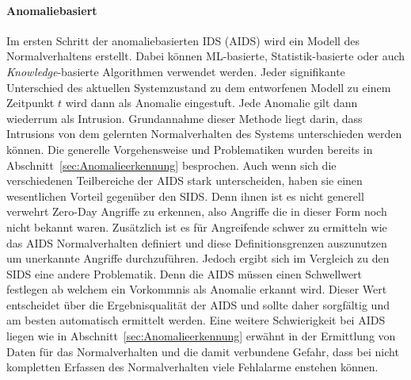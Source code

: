             \paragraph{Anomaliebasiert}
                Im ersten Schritt der anomaliebasierten IDS (AIDS) wird ein Modell des Normalverhaltens erstellt.
                Dabei können ML-basierte, Statistik-basierte oder auch \textit{Knowledge}-basierte  Algorithmen verwendet werden.
                Jeder signifikante Unterschied des aktuellen Systemzustand zu dem entworfenen Modell zu einem Zeitpunkt $t$ wird dann als Anomalie eingestuft.
                Jede Anomalie gilt dann wiederrum als Intrusion.
                Grundannahme dieser Methode liegt darin, dass Intrusions von dem gelernten Normalverhalten des Systems unterschieden werden können.
                Die generelle Vorgehensweise und Problematiken wurden bereits in Abschnitt~\ref{sec:Anomalieerkennung} besprochen.
                Auch wenn sich die verschiedenen Teilbereiche der AIDS stark unterscheiden, haben sie einen wesentlichen Vorteil gegenüber den SIDS\@.
                Denn ihnen ist es nicht generell verwehrt Zero-Day Angriffe zu erkennen, also Angriffe die in dieser Form noch nicht bekannt waren. 
                Zusätzlich ist es für Angreifende schwer zu ermitteln wie das AIDS Normalverhalten definiert und diese Definitionsgrenzen auszunutzen um unerkannte Angriffe durchzuführen.
                Jedoch ergibt sich im Vergleich zu den SIDS eine andere Problematik.
                Denn die AIDS müssen einen Schwellwert festlegen ab welchem ein Vorkommnis als Anomalie erkannt wird.
                Dieser Wert entscheidet über die Ergebnisqualität der AIDS und sollte daher sorgfältig und am besten automatisch ermittelt werden. 
                Eine weitere Schwierigkeit bei AIDS liegen wie in Abschnitt~\ref{sec:Anomalieerkennung} erwähnt in der Ermittlung von Daten für das Normalverhalten und die damit verbundene Gefahr,
                dass bei nicht kompletten Erfassen des Normalverhalten viele Fehlalarme enstehen können.

